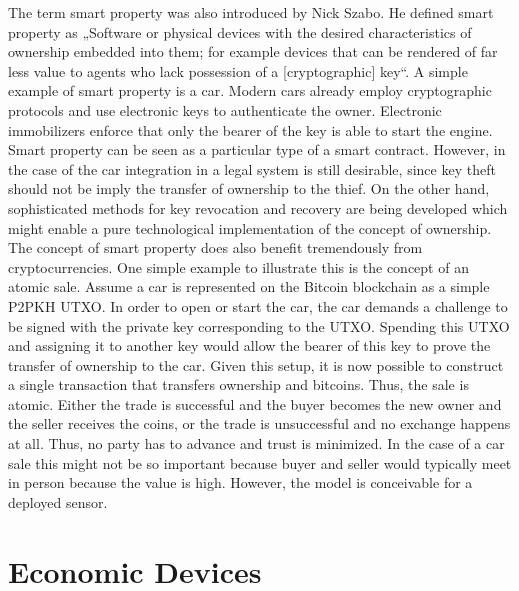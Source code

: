 The term smart property was also introduced by Nick Szabo. He defined smart property as „Software or physical devices with the desired characteristics of ownership embedded into them; for example devices that can be rendered of far less value to agents who lack possession of a [cryptographic] key“. A simple example of smart property is a car. Modern cars already employ cryptographic protocols and use electronic keys to authenticate the owner. Electronic immobilizers enforce that only the bearer of the key is able to start the engine. Smart property can be seen as a particular type of a smart contract. However, in the case of the car integration in a legal system is still desirable, since key theft should not be imply the transfer of ownership to the thief.  On the other hand, sophisticated methods for key revocation and recovery are being developed which might enable a pure technological implementation of the concept of ownership.
The concept of smart property does also benefit tremendously from cryptocurrencies. One simple example to illustrate this is the concept of an atomic sale. Assume a car is represented on the Bitcoin blockchain as a simple \ac{P2PKH} \ac{UTXO}. In order to open or start the car, the car demands a challenge to be signed with the private key corresponding to the \ac{UTXO}. Spending this \ac{UTXO} and assigning it to another key would allow the bearer of this key to prove the transfer of ownership to the car. Given this setup, it is now possible to construct a single transaction that transfers ownership and bitcoins. Thus, the sale is atomic. Either the trade is successful and the buyer becomes the new owner and the seller receives the coins, or the trade is unsuccessful and no exchange happens at all. Thus, no party has to advance and trust is minimized. In the case of a car sale this might not be so important because buyer and seller would typically meet in person because the value is high. However, the model is conceivable for a deployed sensor. 

\section{Economic Devices}

